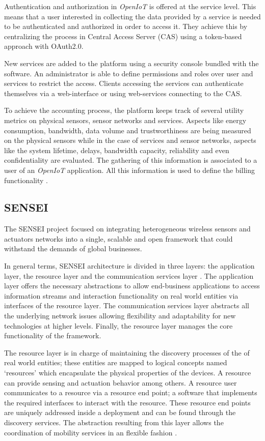 \documentclass[journal]{IEEEtran}
\begin{document}
  Authentication and authorization in \emph{OpenIoT} is offered at the service level. This means that a user interested in collecting the data provided by a service is needed to be authenticated and authorized in order to access it. They achieve this by centralizing the process in Central Access Server (CAS) using a token-based approach with OAuth2.0. 

  New services are added to the platform using a security console bundled with the software. An administrator is able to define permissions and roles over user and services to restrict the access. Clients accessing the services can authenticate themselves via a web-interface or using web-services connecting to the CAS.

  To achieve the accounting process, the platform keeps track of several utility metrics on physical sensors, sensor networks and services. Aspects like energy consumption, bandwidth, data volume and trustworthiness are being measured on the physical sensors while in the case of services and sensor networks, aspects like the system lifetime, delays, bandwidth capacity, reliability and even confidentiality are evaluated. The gathering of this information is associated to a user of an \emph{OpenIoT} application. All this information is used to define the billing functionality \cite{Calbimonte}.

  \subsection{SENSEI}
  The SENSEI project \cite{SENSEIWeb} focused on integrating heterogeneous wireless sensors and actuators networks into a single, scalable and open framework that could withstand the demands of global businesses.
  
  In general terms, SENSEI architecture is divided in three layers: the application layer, the resource layer and the communication services layer \cite{Tsiatsis2010}. The application layer offers the necessary abstractions to allow end-business applications to access information streams and interaction functionality on real world entities via interfaces of the resource layer. The communication services layer abstracts all the underlying network issues allowing flexibility and adaptability for new technologies at higher levels. Finally, the resource layer manages the core functionality of the framework. 

  The resource layer is in charge of maintaining the discovery processes of the of real world entities; these entities are mapped to logical concepts named `resources' which encapsulate the physical properties of the devices. A resource can provide sensing and actuation behavior among others. A resource user communicates to a resource via a resource end point; a software that implements the required interfaces to interact with the resource. These resource end points are uniquely addressed inside a deployment and can be found through the discovery services. The abstraction resulting from this layer allows the coordination of mobility services in an flexible fashion \cite{Tsiatsis2010}. 
  
\end{document}
